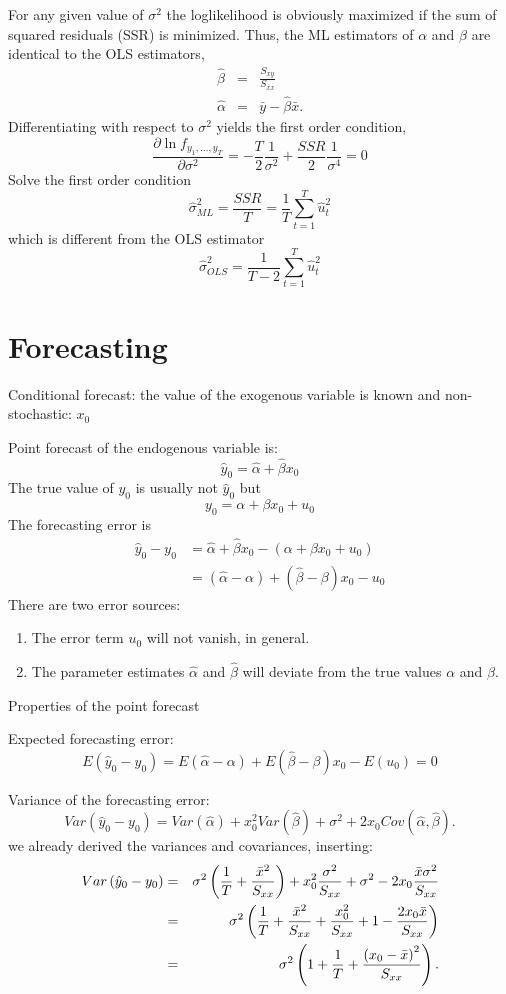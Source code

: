 \documentclass{article}
\begin{document}
For any given value of $\sigma ^{2}$ the loglikelihood is obviously
maximized if the sum of squared residuals (SSR) is minimized. Thus, the ML
estimators of $\alpha $ and $\beta $ are identical to the OLS estimators,%
\begin{eqnarray*}
\hat{\beta} &=&\frac{S_{xy}}{S_{xx}} \\
\hat{\alpha} &=&\bar{y}-\hat{\beta}\bar{x}.
\end{eqnarray*}
Differentiating with respect to $\sigma ^{2}$ yields the first order
condition,
\[ \frac{\partial \ln f_{y_{1},\ldots ,y_{T}}}{\partial \sigma ^{2}}=-\frac{T}{2}
\frac{1}{\sigma ^{2}}+\frac{SSR}{2}\frac{1}{\sigma ^{4}}=0 \]
Solve the first order condition
\[ \hat{\sigma}_{ML}^{2}=\frac{SSR}{T}=\frac{1}{T}\sum_{t=1}^{T}\hat{u}_{t}^{2} \]
which is different from the OLS estimator
\[ \hat{\sigma}_{OLS}^{2}=\frac{1}{T-2}\sum_{t=1}^{T}\hat{u}_{t}^{2} \]

\section{Forecasting}

Conditional forecast: the value of the exogenous variable is known and
non-stochastic: $x_0$

Point forecast of the endogenous variable is:
\[ \hat{y}_{0}=\hat{\alpha}+\hat{\beta}x_{0} \]
The true value of $y_{0}$ is usually not $\hat{y}_{0}$ but
\[ y_{0}=\alpha +\beta x_{0}+u_{0} \]
The forecasting error is
\begin{align*}
\hat{y}_{0}-y_{0} &= \hat{\alpha}+\hat{\beta}x_{0}-\left( \alpha +\beta x_{0}+u_{0}\right) \\
&= (\hat{\alpha}-\alpha)+(\hat{\beta}-\beta) x_{0}-u_{0}
\end{align*}
There are two error sources:
\begin{enumerate}
\item The error term $u_{0}$ will not vanish, in general.
\item The parameter estimates $\hat{\alpha}$ and $\hat{\beta}$ will deviate
from the true values $\alpha $ and $\beta $.
\end{enumerate}
Properties of the point forecast

Expected forecasting error:
\[ E(\hat{y}_0-y_{0})=E(\hat{\alpha}-\alpha)+E(\hat{\beta}-\beta)x_0-E(u_0)=0 \]

Variance of the forecasting error: 
\[ Var\left( \hat{y}_{0}-y_{0}\right) =Var( \hat{\alpha})
+x_{0}^{2}Var( \hat{\beta}) +\sigma ^{2}+2x_{0}Cov( \hat{\alpha},\hat{\beta}) . \]
we already derived the variances and covariances, inserting:
\begin{eqnarray*}
Var\left( \hat{y}_{0}-y_{0}\right) &=&\sigma ^{2}\left( \frac{1}{T}+\frac{%
\bar{x}^{2}}{S_{xx}}\right) +x_{0}^{2}\frac{\sigma ^{2}}{S_{xx}}+\sigma
^{2}-2x_{0}\frac{\bar{x}\sigma ^{2}}{S_{xx}} \\
&=&\sigma ^{2}\left( \frac{1}{T}+\frac{\bar{x}^{2}}{S_{xx}}+\frac{x_{0}^{2}}{%
S_{xx}}+1-\frac{2x_{0}\bar{x}}{S_{xx}}\right) \\
&=&\sigma ^{2}\left( 1+\frac{1}{T}+\frac{\left( x_{0}-\bar{x}\right) ^{2}}{%
S_{xx}}\right) .
\end{eqnarray*}
\end{document}

